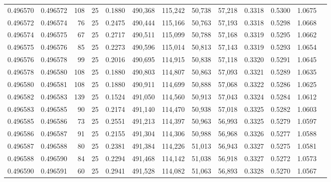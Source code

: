 \begin{tabular}{rrrrrrrrrrrrr}
0.496570 & 0.496572 &   108 &  25 &                                     0.1880 & 490,368 & 115,242 &  50,738 &  57,218 & 0.3318 & 0.5300 & 1.0675 \\
0.496572 & 0.496574 &    76 &  25 &                                     0.2475 & 490,444 & 115,166 &  50,763 &  57,193 & 0.3318 & 0.5298 & 1.0668 \\
0.496574 & 0.496575 &    67 &  25 &                                     0.2717 & 490,511 & 115,099 &  50,788 &  57,168 & 0.3319 & 0.5295 & 1.0662 \\
0.496575 & 0.496576 &    85 &  25 &                                     0.2273 & 490,596 & 115,014 &  50,813 &  57,143 & 0.3319 & 0.5293 & 1.0654 \\
0.496576 & 0.496578 &    99 &  25 &                                     0.2016 & 490,695 & 114,915 &  50,838 &  57,118 & 0.3320 & 0.5291 & 1.0645 \\
0.496578 & 0.496580 &   108 &  25 &                                     0.1880 & 490,803 & 114,807 &  50,863 &  57,093 & 0.3321 & 0.5289 & 1.0635 \\
0.496580 & 0.496581 &   108 &  25 &                                     0.1880 & 490,911 & 114,699 &  50,888 &  57,068 & 0.3322 & 0.5286 & 1.0625 \\
0.496582 & 0.496583 &   139 &  25 &                                     0.1524 & 491,050 & 114,560 &  50,913 &  57,043 & 0.3324 & 0.5284 & 1.0612 \\
0.496583 & 0.496585 &    90 &  25 &                                     0.2174 & 491,140 & 114,470 &  50,938 &  57,018 & 0.3325 & 0.5282 & 1.0603 \\
0.496585 & 0.496586 &    73 &  25 &                                     0.2551 & 491,213 & 114,397 &  50,963 &  56,993 & 0.3325 & 0.5279 & 1.0597 \\
0.496586 & 0.496587 &    91 &  25 &                                     0.2155 & 491,304 & 114,306 &  50,988 &  56,968 & 0.3326 & 0.5277 & 1.0588 \\
0.496587 & 0.496588 &    80 &  25 &                                     0.2381 & 491,384 & 114,226 &  51,013 &  56,943 & 0.3327 & 0.5275 & 1.0581 \\
0.496588 & 0.496590 &    84 &  25 &                                     0.2294 & 491,468 & 114,142 &  51,038 &  56,918 & 0.3327 & 0.5272 & 1.0573 \\
0.496590 & 0.496591 &    60 &  25 &                                     0.2941 & 491,528 & 114,082 &  51,063 &  56,893 & 0.3328 & 0.5270 & 1.0567 \\

\end{tabular}
